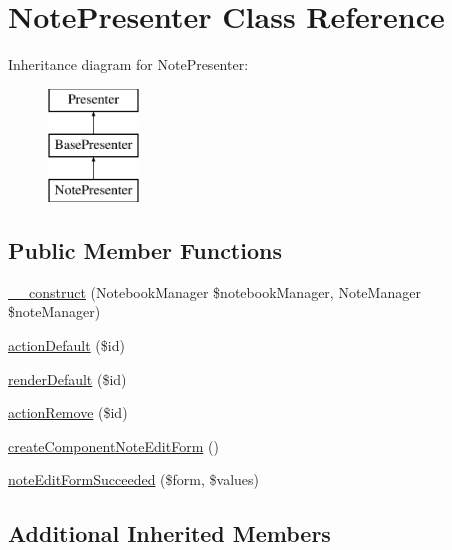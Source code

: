 \hypertarget{class_app_1_1_presenters_1_1_note_presenter}{}\section{Note\+Presenter Class Reference}
\label{class_app_1_1_presenters_1_1_note_presenter}
Inheritance diagram for Note\+Presenter\+:\begin{figure}[H]
\begin{center}
\leavevmode
\includegraphics[height=3.000000cm]{class_app_1_1_presenters_1_1_note_presenter}
\end{center}
\end{figure}
\subsection*{Public Member Functions}
\begin{DoxyCompactItemize}
\item 
\mbox{\hyperlink{class_app_1_1_presenters_1_1_note_presenter_abf10af0e00d40379ce44c79183832689}{\+\_\+\+\_\+construct}} (Notebook\+Manager \$notebook\+Manager, Note\+Manager \$note\+Manager)
\item 
\mbox{\hyperlink{class_app_1_1_presenters_1_1_note_presenter_abc9fade9634c03fc324b4559fbe2abfb}{action\+Default}} (\$id)
\item 
\mbox{\hyperlink{class_app_1_1_presenters_1_1_note_presenter_ac57e2ee064c6a891f41051ef6e116c1f}{render\+Default}} (\$id)
\item 
\mbox{\hyperlink{class_app_1_1_presenters_1_1_note_presenter_ab7e4d6093e671c38971e19e7a45f322b}{action\+Remove}} (\$id)
\item 
\mbox{\hyperlink{class_app_1_1_presenters_1_1_note_presenter_adbe06f4aac8adda69c1cf4cefcc9c58d}{create\+Component\+Note\+Edit\+Form}} ()
\item 
\mbox{\hyperlink{class_app_1_1_presenters_1_1_note_presenter_a31fc3d689c7087bb9650b232ce35cca3}{note\+Edit\+Form\+Succeeded}} (\$form, \$values)
\end{DoxyCompactItemize}
\subsection*{Additional Inherited Members}


